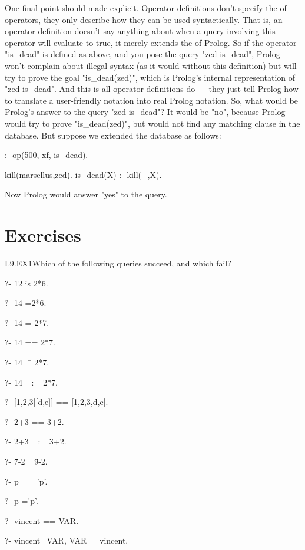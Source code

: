 One final point should made explicit. Operator definitions don't
specify the  of operators, they only describe how
they can be used syntactically. That is, an operator definition
doesn't say anything about when a query involving this operator will
evaluate to true, it merely extends the  of
Prolog. So if the operator "is_dead" is defined as above, and you pose
the query "zed is_dead", Prolog won't complain about illegal syntax
(as it would without this definition) but  will try to prove the
goal "is_dead(zed)", which is Prolog's internal representation of
"zed is_dead". And this is all operator definitions do --- they just tell
Prolog how to translate a user-friendly notation into real Prolog
notation. So, what would be Prolog's answer to the query
"zed is_dead"? It would be "no", because Prolog would try to prove
"is_dead(zed)", but would not find any matching clause in the
database.  But suppose we extended the database as follows:
\begin{LPNcodedisplay}
:- op(500, xf, is_dead).

kill(marsellus,zed).
is_dead(X) :- kill(_,X).
\end{LPNcodedisplay}
Now Prolog would answer "yes" to the query.


\section{Exercises}\label{SEC.L9.EXERCISES}

\begin{LPNexercise}{L9.EX1}Which of the following queries succeed, and which fail?
\begin{LPNcodedisplay}
?- 12 is 2*6.

?- 14 =\= 2*6.

?- 14 = 2*7.

?- 14 == 2*7.

?- 14 \== 2*7.

?- 14 =:= 2*7.

?- [1,2,3|[d,e]] == [1,2,3,d,e].

?- 2+3 == 3+2.

?- 2+3 =:= 3+2.

?- 7-2 =\= 9-2.

?- p == 'p'.

?- p =\= 'p'.

?- vincent == VAR.

?- vincent=VAR, VAR==vincent.

\end{LPNcodedisplay}
\end{LPNexercise}

